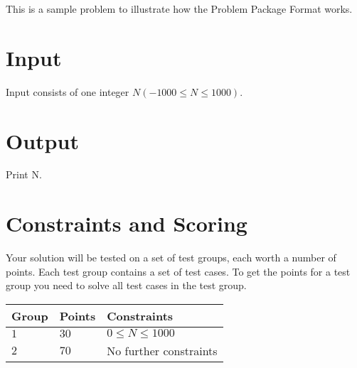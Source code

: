 This is a sample problem to illustrate how the Problem Package Format works.
\section*{Input}
Input consists of one integer $N (-1000 \le N \le 1000)$.
\section*{Output}
Print N.
\section*{Constraints and Scoring}
Your solution will be tested on a set of test groups, each worth a number of points.
Each test group contains a set of test cases.
To get the points for a test group you need to solve all test cases in the test group.

\noindent
\begin{tabular}{| l | l | l |}
  \hline
  Group & Points & Constraints\\ \hline
  $1$   & $30$   & $0 \le N \le 1000$ \\ \hline
  $2$   & $70$   & No further constraints \\ \hline
\end{tabular}

